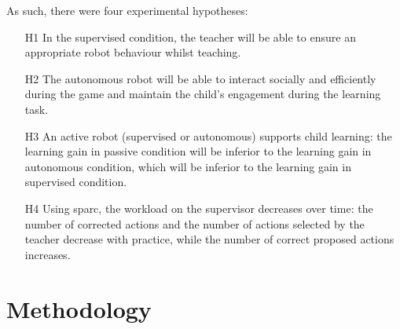 
As such, there were four experimental hypotheses:
\begin{itemize}
	\item [H1] In the supervised condition, the teacher will be able to ensure an appropriate robot behaviour whilst teaching.
	\item [H2] The autonomous robot will be able to interact socially and efficiently during the game and maintain the child's engagement during the learning task.
	\item [H3] An active robot (supervised or autonomous) supports child learning: the learning gain in passive condition will be inferior to the learning gain in autonomous condition, which will be inferior to the learning gain in supervised condition.
	\item [H4] Using \gls{sparc}, the workload on the supervisor decreases over time: the number of corrected actions and the number of actions selected  by the teacher decrease with practice, while the number of correct proposed actions increases.
\end{itemize}

\section{Methodology}

